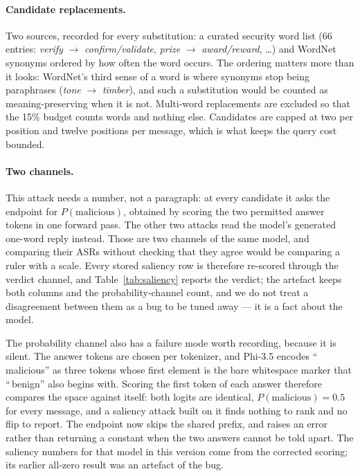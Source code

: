 \paragraph{Candidate replacements.} Two sources, recorded for every substitution:
a curated security word list (66 entries: \emph{verify} $\rightarrow$
\emph{confirm/validate}, \emph{prize} $\rightarrow$ \emph{award/reward}, \ldots)
and WordNet~\cite{miller1995wordnet} synonyms ordered by how often the word
occurs. The ordering matters more than it looks: WordNet's third sense of a word
is where synonyms stop being paraphrases (\emph{tone} $\rightarrow$
\emph{timber}), and such a substitution would be counted as meaning-preserving
when it is not. Multi-word replacements are excluded so that the 15\% budget
counts words and nothing else. Candidates are capped at two per position and
twelve positions per message, which is what keeps the query cost bounded.

\paragraph{Two channels.} This attack needs a number, not a paragraph: at every
candidate it asks the endpoint for $P(\text{malicious})$, obtained by scoring the
two permitted answer tokens in one forward pass. The other two attacks read the
model's generated one-word reply instead. Those are two channels of the same
model, and comparing their ASRs without checking that they agree would be
comparing a ruler with a scale. Every stored saliency row is therefore re-scored
through the verdict channel, and Table~\ref{tab:saliency} reports the verdict;
the artefact keeps both columns and the probability-channel count, and we do not
treat a disagreement between them as a bug to be tuned away --- it is a fact about
the model.

The probability channel also has a failure mode worth recording, because it is
silent. The answer tokens are chosen per tokenizer, and Phi-3.5 encodes
``\,malicious'' as three tokens whose first element is the bare whitespace
marker that ``\,benign'' also begins with. Scoring the first token of each answer
therefore compares the space against itself: both logits are identical,
$P(\text{malicious}) = 0.5$ for every message, and a saliency attack built on it
finds nothing to rank and no flip to report. The endpoint now skips the shared
prefix, and raises an error rather than returning a constant when the two answers
cannot be told apart. The saliency numbers for that model in this version come
from the corrected scoring; its earlier all-zero result was an artefact of the
bug.

